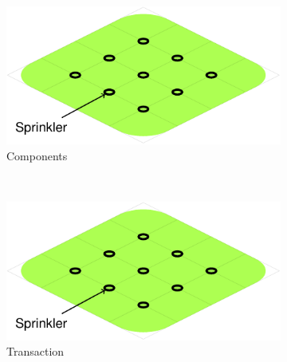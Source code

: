 \begin{figure}[!ht]
  \begin{subfigure}{\columnwidth}
    \includegraphics[page=5]{figures/introduction/figures/main.pdf}
    \caption{Components\label{fig:intro:example-sfl-components}}
  \end{subfigure}
  \\[2em]
  \begin{subfigure}{\columnwidth}
    \includegraphics[page=6]{figures/introduction/figures/main.pdf}
    \caption{Transaction\label{fig:intro:example-sfl-transaction}}
  \end{subfigure}
  \\[2em]
  \begin{subfigure}{\columnwidth}
    \bgroup
    \def\x{{\Large$\bullet$}}
    \setlength\tabcolsep{0.2em}


\end{subfigure}
\end{figure}
